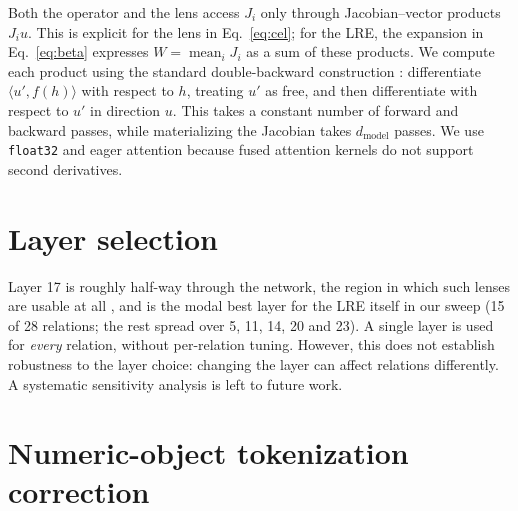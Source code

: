 \documentclass{article}
\begin{document}
Both the operator and the lens access $J_i$ only through
Jacobian--vector products $J_i u$. This is explicit for the lens in
Eq.~\ref{eq:cel}; for the LRE, the expansion in Eq.~\ref{eq:beta}
expresses $W = \operatorname{mean}_i J_i$ as a sum of these products. We
compute each product using the standard double-backward construction
\citep{pearlmutter1994fast}: differentiate $\langle u', f(h)\rangle$
with respect to $h$, treating $u'$ as free, and then differentiate with
respect to $u'$ in direction $u$. This takes a constant number of forward
and backward passes, while materializing the Jacobian takes
$d_{\text{model}}$ passes. We use \texttt{float32} and eager attention
because fused attention kernels do not support second derivatives.

\section{Layer selection}
\label{sec:layer17}
Layer 17 is roughly half-way through the network,
the region in which such lenses are usable at all
\citep{gurnee2026workspace}, and is the modal best layer for the LRE
itself in our sweep (15 of 28 relations; the rest spread over 5, 11, 14,
20 and 23). A single layer is used for \emph{every}
relation, without per-relation tuning. However, this does not establish robustness to
the layer choice: changing the layer can affect relations differently.
A systematic sensitivity analysis is left to future work.


%

\section{Numeric-object tokenization correction}
\label{sec:numeric-objects}
\end{document}
